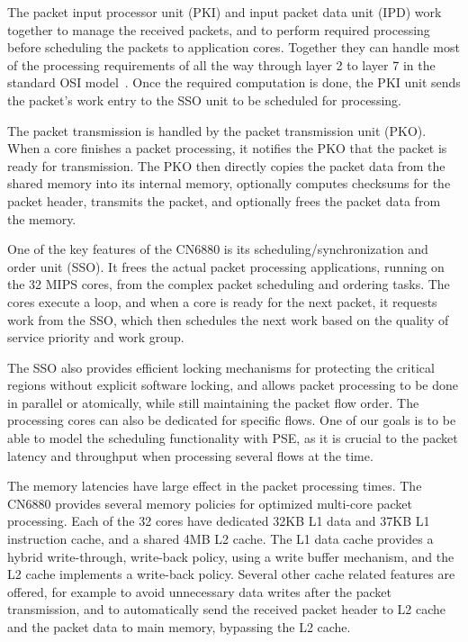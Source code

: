The packet input processor unit (PKI) and input packet data unit (IPD) work together to manage the received packets, and to perform required processing before scheduling the packets to application cores. Together they can handle most of the processing requirements of all the way through layer 2 to layer 7 in the standard OSI model~\cite{ISO:1994:OSI}. Once the required computation is done, the PKI unit sends the packet's work entry to the SSO unit to be scheduled for processing.~\cite{cavium:2010:fundamentals}

The packet transmission is handled by the packet transmission unit (PKO). When a core finishes a packet processing, it notifies the PKO that the packet is ready for transmission. The PKO then directly copies the packet data from the shared memory into its internal memory, optionally computes checksums for the packet header, transmits the packet, and optionally frees the packet data from the memory.~\cite{cavium:2010:fundamentals}

One of the key features of the CN6880 is its scheduling/synchronization and order unit (SSO). It frees the actual packet processing applications, running on the 32 MIPS cores, from the complex packet scheduling and ordering tasks. The cores execute a loop, and when a core is ready for the next packet, it requests work from the SSO, which then schedules the next work based on the quality of service priority and work group.~\cite{cavium:2010:fundamentals}

The SSO also provides efficient locking mechanisms for protecting the critical regions without explicit software locking, and allows packet processing to be done in parallel or atomically, while still maintaining the packet flow order. The processing cores can also be dedicated for specific flows. One of our goals is to be able to model the scheduling functionality with PSE, as it is crucial to the packet latency and throughput when processing several flows at the time.~\cite{cavium:2010:fundamentals}

The memory latencies have large effect in the packet processing times. The CN6880 provides several memory policies for optimized multi-core packet processing. Each of the 32 cores have dedicated 32KB L1 data and 37KB L1 instruction cache, and a shared 4MB L2 cache. The L1 data cache provides a hybrid write-through, write-back policy, using a write buffer mechanism, and the L2 cache implements a write-back policy. Several other cache related features are offered, for example to avoid unnecessary data writes after the packet transmission, and to automatically send the received packet header to L2 cache and the packet data to main memory, bypassing the L2 cache.~\cite{cavium:2010:fundamentals}


